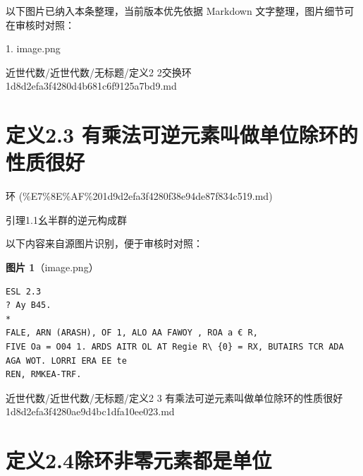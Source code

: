 \begin{note}[关联图片]
以下图片已纳入本条整理，当前版本优先依据 Markdown 文字整理，图片细节可在审核时对照：

1. image.png\\

\end{note}

\begin{note}[来源路径]

近世代数/近世代数/无标题/定义2 2交换环 1d8d2efa3f4280d4b681c6f9125a7bd9.md

\end{note}

\section*{定义2.3 有乘法可逆元素叫做单位除环的性质很好}

\begin{note}[来源上级主题]

环 (\%E7\%8E\%AF\%201d9d2efa3f4280f38e94de87f834c519.md)

\end{note}

\begin{definition}[定义2.3 有乘法可逆元素叫做单位除环的性质很好]

引理1.1幺半群的逆元构成群

\end{definition}

\begin{note}
以下内容来自源图片识别，便于审核时对照：

\textbf{图片 1}（image.png）
\begin{Verbatim}[fontsize=\small]
ESL 2.3
? Ay B45.
*
FALE, ARN (ARASH), OF 1, ALO AA FAWOY , ROA a € R,
FIVE Oa = O04 1. ARDS AITR OL AT Regie R\ {0} = RX, BUTAIRS TCR ADA AGA WOT. LORRI ERA EE te
REN, RMKEA-TRF.
\end{Verbatim}

\end{note}

\begin{note}[来源路径]

近世代数/近世代数/无标题/定义2 3 有乘法可逆元素叫做单位除环的性质很好 1d8d2efa3f4280ae9d4bc1dfa10ee023.md

\end{note}

\section*{定义2.4除环非零元素都是单位}

